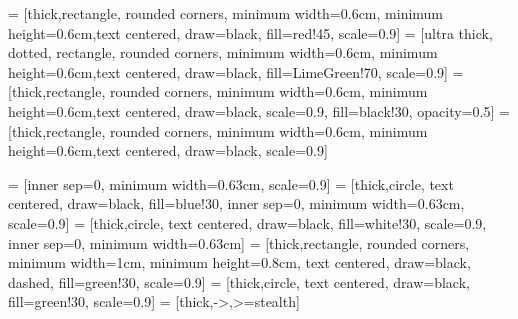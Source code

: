 \usepackage{graphicx}
\usepackage{tikz}
\usetikzlibrary{shapes.geometric, arrows}
\usetikzlibrary{fit}
\usetikzlibrary{svg.path}
\usetikzlibrary{decorations}
\usetikzlibrary{decorations.markings}
\usetikzlibrary{backgrounds}
\usetikzlibrary{tikzmark}

 = [thick,rectangle, rounded corners, minimum width=0.6cm, minimum height=0.6cm,text centered, draw=black, fill=red!45, scale=0.9]
 = [ultra thick, dotted, rectangle, rounded corners, minimum width=0.6cm, minimum height=0.6cm,text centered, draw=black, fill=LimeGreen!70, scale=0.9]
 = [thick,rectangle, rounded corners, minimum width=0.6cm, minimum height=0.6cm,text centered, draw=black, scale=0.9, fill=black!30, opacity=0.5]
 = [thick,rectangle, rounded corners, minimum width=0.6cm, minimum height=0.6cm,text centered, draw=black, scale=0.9]

 = [inner sep=0, minimum width=0.63cm, scale=0.9]
 = [thick,circle, text centered, draw=black, fill=blue!30, inner sep=0, minimum width=0.63cm, scale=0.9]
 = [thick,circle, text centered, draw=black, fill=white!30, scale=0.9, inner sep=0, minimum width=0.63cm]
 = [thick,rectangle, rounded corners, minimum width=1cm, minimum height=0.8cm, text centered, draw=black, dashed, fill=green!30, scale=0.9]
 = [thick,circle, text centered, draw=black, fill=green!30, scale=0.9]
 = [thick,->,>=stealth]
\newcommand{\triplearrow}[2]{
  \draw [arrow, bend right] (#1) edge (#2);
  \draw [arrow, bend left] (#1) edge (#2);
  \draw [arrow] (#1) -- (#2);
}



